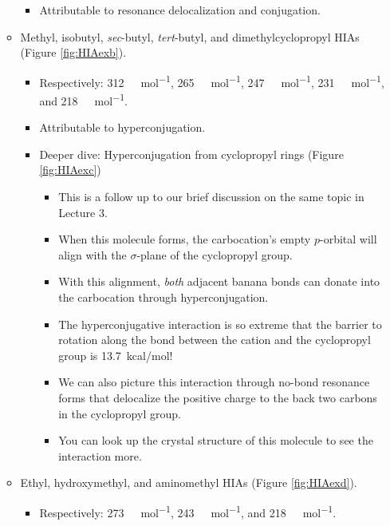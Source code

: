 \documentclass[../notes.tex]{subfiles}
\begin{document}
\begin{itemize}
\begin{itemize}
\begin{itemize}
            \item Attributable to resonance delocalization and conjugation.
        \end{itemize}
        \item Methyl, isobutyl, \emph{sec}-butyl, \emph{tert}-butyl, and dimethylcyclopropyl HIAs (Figure \ref{fig:HIAexb}).
        \begin{itemize}
            \item Respectively: \SI[per-mode=symbol]{312}{\kilo\calorie\per\mole}, \SI[per-mode=symbol]{265}{\kilo\calorie\per\mole}, \SI[per-mode=symbol]{247}{\kilo\calorie\per\mole}, \SI[per-mode=symbol]{231}{\kilo\calorie\per\mole}, and \SI[per-mode=symbol]{218}{\kilo\calorie\per\mole}.
            \item Attributable to hyperconjugation.
            \item Deeper dive: Hyperconjugation from cyclopropyl rings (Figure \ref{fig:HIAexc})
            \begin{itemize}
                \item This is a follow up to our brief discussion on the same topic in Lecture 3.
                \item When this molecule forms, the carbocation's empty $p$-orbital will align with the $\sigma$-plane of the cyclopropyl group.
                \item With this alignment, \emph{both} adjacent  banana bonds can donate into the carbocation through hyperconjugation.
                \item The hyperconjugative interaction is so extreme that the barrier to rotation along the bond between the cation and the cyclopropyl group is \SI{13.7}{kcal/mol}!
                \item We can also picture this interaction through no-bond resonance forms that delocalize the positive charge to the back two carbons in the cyclopropyl group.
                \item You can look up the crystal structure of this molecule to see the interaction more.
            \end{itemize}
        \end{itemize}
        \item Ethyl, hydroxymethyl, and aminomethyl HIAs (Figure \ref{fig:HIAexd}).
        \begin{itemize}
            \item Respectively: \SI[per-mode=symbol]{273}{\kilo\calorie\per\mole}, \SI[per-mode=symbol]{243}{\kilo\calorie\per\mole}, and \SI[per-mode=symbol]{218}{\kilo\calorie\per\mole}.

\end{itemize}
\end{itemize}
\end{itemize}
\end{document}
